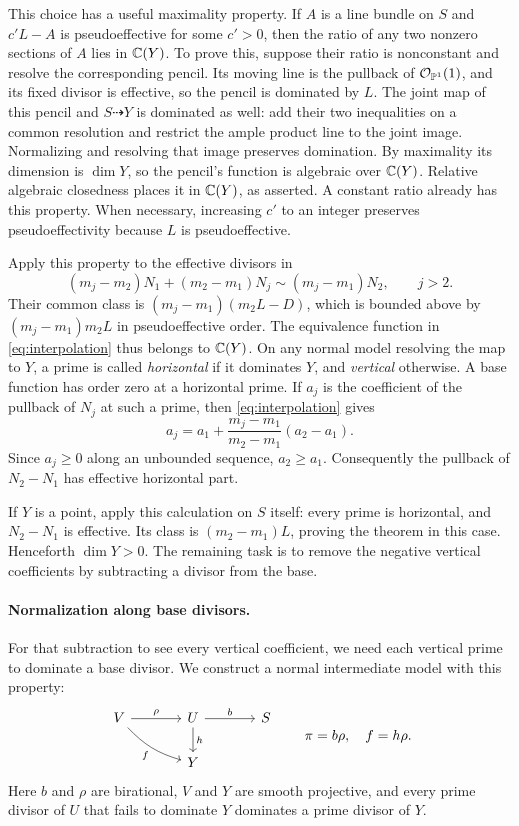 This choice has a useful maximality property. If \(A\) is a line
bundle on \(S\) and \(c'L-A\) is pseudoeffective for some
\(c'>0\), then the ratio of any two nonzero sections of \(A\)
lies in \(\mathbb C(Y)\). To prove this, suppose their ratio is nonconstant
and resolve the corresponding pencil. Its moving line is the pullback
of \(\mathcal O_{\mathbb P^1}(1)\), and its fixed divisor is effective, so the
pencil is dominated by \(L\). The joint map of this pencil and
\(S\dashrightarrow Y\) is dominated as well: add their two
inequalities on a common resolution and restrict the ample product
line to the joint image. Normalizing and resolving that image preserves
domination. By maximality its dimension is \(\dim Y\), so the
pencil's function is algebraic over \(\mathbb C(Y)\). Relative algebraic
closedness places it in \(\mathbb C(Y)\), as asserted. A constant ratio
already has this property. When necessary, increasing \(c'\) to an
integer preserves pseudoeffectivity because \(L\) is pseudoeffective.

Apply this property to the effective divisors in
\begin{equation}\label{eq:interpolation}
(m_j-m_2)N_1+(m_2-m_1)N_j
\sim(m_j-m_1)N_2,\qquad j>2.
\end{equation}
Their common class is \((m_j-m_1)(m_2L-D)\), which is bounded
above by \((m_j-m_1)m_2L\) in pseudoeffective order. The equivalence
function in \eqref{eq:interpolation} thus belongs to \(\mathbb C(Y)\).
On any normal model resolving the map to \(Y\), a prime is called
\emph{horizontal} if it dominates \(Y\), and \emph{vertical} otherwise.
A base function has order zero at a horizontal prime. If \(a_j\) is
the coefficient of the pullback of \(N_j\) at such a prime, then
\eqref{eq:interpolation} gives
\[
a_j=a_1+\frac{m_j-m_1}{m_2-m_1}(a_2-a_1).
\]
Since \(a_j\ge0\) along an unbounded sequence, \(a_2\ge a_1\).
Consequently the pullback of \(N_2-N_1\) has effective horizontal part.

If \(Y\) is a point, apply this calculation on \(S\) itself: every
prime is horizontal, and \(N_2-N_1\) is effective. Its class is
\((m_2-m_1)L\), proving the theorem in this case. Henceforth
\(\dim Y>0\). The remaining task is to remove the negative vertical
coefficients by subtracting a divisor from the base.

\paragraph{Normalization along base divisors.}
For that subtraction to see every vertical coefficient, we need each
vertical prime to dominate a base divisor. We construct a normal
intermediate model with this property:
\[
\begin{tikzcd}[column sep=large]
V\arrow[r,"\rho"]\arrow[dr,bend right=15,"f"']&
U\arrow[r,"b"]\arrow[d,"h"]&S\\
&Y&
\end{tikzcd}
\qquad \pi=b\rho,\quad f=h\rho.
\]
Here \(b\) and \(\rho\) are birational, \(V\) and \(Y\) are
smooth projective, and every prime divisor of \(U\) that fails to
dominate \(Y\) dominates a prime divisor of \(Y\).

